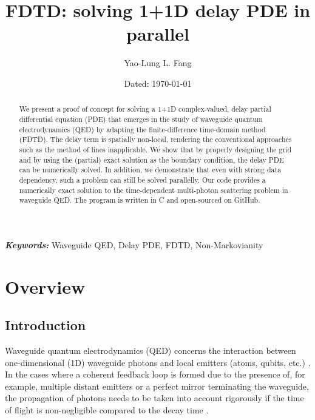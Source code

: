 \documentclass[12pt,letter,onecolumn,notitlepage]{article}
\providecommand{\keywords}[1]{\textbf{\textit{Keywords:}} #1}
\begin{document}
\title{FDTD: solving 1+1D delay PDE in parallel}
\author[1,2]{Yao-Lung L. Fang}
\date{\footnotesize Dated: \today}
\maketitle

\begin{abstract}
	We present a proof of concept for solving a 1+1D complex-valued, delay partial differential equation (PDE) that emerges in the study of waveguide quantum electrodynamics (QED) by adapting the finite-difference time-domain method (FDTD). The delay term is spatially non-local, rendering the conventional approaches such as the method of lines inapplicable. 
	We show that by properly designing the grid and by using the (partial) exact solution as the boundary condition, the delay PDE can be numerically solved. In addition, we demonstrate that even with strong data dependency, such a problem can still be solved parallelly. Our code provides a numerically exact solution to the time-dependent multi-photon scattering problem in waveguide QED. The program is written in C and open-sourced on GitHub.%
\end{abstract}

\keywords{Waveguide QED, Delay PDE, FDTD, Non-Markovianity}


\tableofcontents

\section{Overview}
\subsection{Introduction}
Waveguide quantum electrodynamics (QED) concerns the interaction between one-dimensional (1D) waveguide photons and local emitters (atoms, qubits, etc.) \cite{LodahlRMP15,RoyRMP17,NohRPP16,LiaoPhyScr16}. In the cases where a coherent feedback loop is formed due to the presence of, for example, multiple distant emitters or a perfect mirror terminating the waveguide, the propagation of photons needs to be taken into account rigorously if the time of flight is non-negligible compared to the decay time \cite{ZhengPRL13,TufarelliPRA14,FangPRA15,GrimsmoPRL15,RamosPRA16,PichlerPRL16}.
\end{document}

